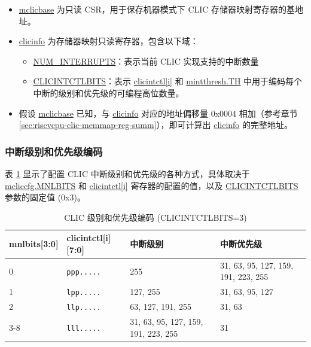 \documentclass[main\_\_CN.tex]{subfiles}
\begin{document}
\begin{itemize}
    \item \hyperref[regdesc:MCLICBASE_REG]{mclicbase} 为只读 CSR，用于保存机器模式下 CLIC 存储器映射寄存器的基地址。
    \item \hyperref[regdesc:CLICINFO_REG]{clicinfo} 为存储器映射只读寄存器，包含以下域：
    \begin{itemize}
        \item \hyperref[fielddesc:CLICINFO_NUM_INTERRUPTS]{NUM\_INTERRUPTS}：表示当前 CLIC 实现支持的中断数量
        \item \hyperref[fielddesc:CLICINFO_CLICINTCTLBITS]{CLICINTCTLBITS}：表示 \hyperref[regdesc:MCLICINTCTL_REG_i]{clicintctl[i]} 和 \hyperref[fielddesc:MINTTHRESH_TH]{{mintthresh.TH}} 中用于编码每个中断的级别和优先级的可编程高位数量。
    \end{itemize}
    \item 假设 \hyperref[fielddesc:MCLICBASE]{mclicbase} 已知，与 \hyperref[regdesc:CLICINFO_REG]{clicinfo} 对应的地址偏移量 0x0004 相加（参考章节 \ref{sec:riscvcpu-clic-memmap-reg-summ}），即可计算出 \hyperref[regdesc:CLICINFO_REG]{clicinfo} 的完整地址。
\end{itemize}


\hypertarget{riscvcpu-clic-int-level-prio}{}
\subsubsection{中断级别和优先级编码}
\label{sec:riscvcpu-clic-int-level-prio}

表 \ref{tab:riscv-clic-level-priority} 显示了配置 CLIC 中断级别和优先级的各种方式，具体取决于 \hyperref[fielddesc:MCLICCFG_MNLBITS]{mcliccfg.MNLBITS} 和 \hyperref[regdesc:MCLICINTCTL_REG_i]{clicintctl[i]} 寄存器的配置的值，以及 \hyperref[fielddesc:CLICINFO_CLICINTCTLBITS]{CLICINTCTLBITS} 参数的固定值 (0x3)。

\begin{longtable}{ | l | l | l | l | }
\caption{CLIC 级别和优先级编码 (CLICINTCTLBITS=3)}
\label{tab:riscv-clic-level-priority}
\\\hline
\rowcolor{lightgray}
mnlbits[3:0] & clicintctl[i][7:0] & 中断级别 & 中断优先级 \\ \hline
0   & \texttt{ppp.....} & 255 & 31, 63, 95, 127, 159, 191, 223, 255 \\ \hline
1   & \texttt{lpp.....} & 127, 255 & 31, 63, 95, 127 \\ \hline
2   & \texttt{llp.....} & 63, 127, 191, 255 & 31, 63 \\ \hline
3-8 & \texttt{lll.....} & 31, 63, 95, 127, 159, 191, 223, 255 & 31 \\ \hline
\end{longtable}
\end{document}
